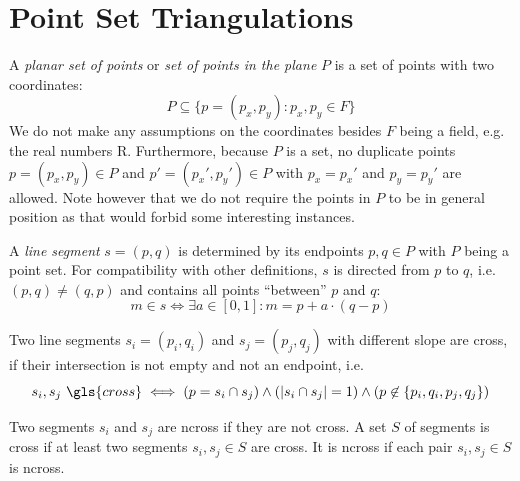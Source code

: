 \section{Point Set Triangulations}


\begin{definition}
  A \emph{planar set of points} or \emph{set of points in the plane}
  \(P\) is a set of points with two coordinates:
  \[ P \subseteq \{p = (p_x,p_y) : p_x,p_y \in F\} \]
  We do not make any assumptions on the coordinates besides \(F\)
  being a field, e.g. the real numbers \gls{R}. Furthermore,
  because \(P\) is a set, no duplicate points \(p=(p_x,p_y)\in P\) and
  \(p'=(p_x',p_y')\in P\) with \(p_x=p_x'\) and \(p_y=p_y'\) are allowed.
  Note however that we do not require the points in \(P\) to be in 
  general position as that would forbid some interesting instances.
\end{definition}


\begin{definition}
  A \emph{line segment} \(s=(p,q)\) is determined by its endpoints
  \(p,q\in P\) with \(P\) being a point set. For compatibility
  with other definitions, \(s\) is directed from \(p\) to \(q\), i.e.
  \((p,q)\not=(q,p)\) and contains all points ``between'' \(p\) and
  \(q\):
  \[ m \in s \iff \exists a\in [0,1] : m = p + a \cdot (q-p) \]
\end{definition}


\begin{definition}[Crossing]\label{def:crossing}
  Two line segments \(s_i=(p_i,q_i)\) and \(s_j=(p_j,q_j)\) with 
  different slope are \gls{cross}, if their intersection is not empty
  and not an endpoint, i.e.
  \[
    s_i, s_j~\gls{cross}
    \iff
    (p = s_i\cap s_j) \land
    (|s_i\cap s_j| = 1) \land
    (p \not\in \{p_i,q_i,p_j,q_j\})
  \]

  Two segments \(s_i\) and \(s_j\) are \gls{ncross} if they are
  not \gls{cross}. A set \(S\) of segments is \gls{cross} if at least
  two segments \(s_i, s_j \in S\) are \gls{cross}. It is \gls{ncross}
  if each pair \(s_i, s_j \in S\) is \gls{ncross}.
\end{definition}


